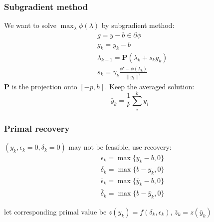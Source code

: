 \begin{frame}
  \frametitle{Subgradient method}
  We want to solve \(\max_\lambda \phi(\lambda)\) by subgradient method:
  \begin{equation}\label{eq:simple_subgrad}
    \begin{aligned}
       & g = y - b  \in \partial \phi                                     \\
       & g_k = y_k - b                                                    \\
       & \lambda_{k+1} = \mathbf{P}(\lambda_{k} + s_{k}g_{k})             \\
       & s_{k} = \gamma_k\frac{\phi^\star - \phi(\lambda_k)}{\|g_{k}\|^2}
    \end{aligned}
  \end{equation}
  \(\mathbf{P}\) is the projection onto \([-p, h]\). Keep the averaged solution:
  \begin{equation}\label{eq:avg}
    \bar y_k = \frac{1}{k}\sum_i^k y_i
  \end{equation}

\end{frame}
\begin{frame}
  \frametitle{Primal recovery}
  \((y_k, \epsilon_k = 0, \delta_k = 0)\) may not be feasible, use recovery:
  \begin{equation}\label{eq:recovery}
    \begin{aligned}
       & \epsilon_k = \max\{y_k - b, 0\}           \\
       & \delta_k = \max\{b - y_k, 0\}             \\
       & \bar \epsilon_k = \max\{\bar y_k - b, 0\} \\
       & \bar \delta_k = \max\{b - \bar y_k, 0\}
    \end{aligned}\end{equation}

  let corresponding primal value  be \(z(y_k) = f(\delta_k, \epsilon_k)\), \(\bar z_k = z(\bar y_k)\)
\end{frame}

